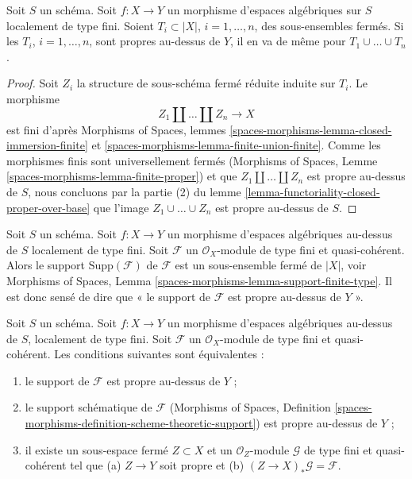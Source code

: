 \begin{lemma}
\label{lemma-union-closed-proper-over-base}
Soit $S$ un schéma.
Soit $f : X \to Y$ un morphisme d'espaces algébriques sur $S$
localement de type fini.
Soient $T_i \subset |X|$, $i = 1, \ldots, n$, des sous-ensembles fermés.
Si les $T_i$, $i = 1, \ldots, n$, sont propres au-dessus de $Y$, il en va de même
pour $T_1 \cup \ldots \cup T_n$.
\end{lemma}

\begin{proof}
Soit $Z_i$ la structure de sous-schéma fermé réduite induite sur $T_i$.
Le morphisme
$$
Z_1 \amalg \ldots \amalg Z_n \longrightarrow X
$$
est fini d'après Morphisms of Spaces, lemmes
\ref{spaces-morphisms-lemma-closed-immersion-finite} et
\ref{spaces-morphisms-lemma-finite-union-finite}.
Comme les morphismes finis sont universellement fermés
(Morphisms of Spaces, Lemme \ref{spaces-morphisms-lemma-finite-proper})
et que $Z_1 \amalg \ldots \amalg Z_n$ est propre au-dessus de $S$,
nous concluons par la partie (2) du lemme
\ref{lemma-functoriality-closed-proper-over-base}
que l'image $Z_1 \cup \ldots \cup Z_n$ est propre au-dessus de $S$.
\end{proof}

\noindent
Soit $S$ un schéma.
Soit $f : X \to Y$ un morphisme d'espaces algébriques au-dessus de $S$
localement de type fini. Soit $\mathcal{F}$ un
$\mathcal{O}_X$-module de type fini et quasi-cohérent. Alors le support
$\text{Supp}(\mathcal{F})$ de $\mathcal{F}$ est un sous-ensemble fermé de $|X|$, voir
Morphisms of Spaces, Lemma \ref{spaces-morphisms-lemma-support-finite-type}.
Il est donc sensé de dire que
« le support de $\mathcal{F}$ est propre au-dessus de $Y$ ».

\begin{lemma}
\label{lemma-module-support-proper-over-base}
Soit $S$ un schéma. Soit $f : X \to Y$ un morphisme d'espaces
algébriques au-dessus de $S$, localement de type fini.
Soit $\mathcal{F}$ un $\mathcal{O}_X$-module de type fini et
quasi-cohérent. Les conditions suivantes sont équivalentes :
\begin{enumerate}
\item le support de $\mathcal{F}$ est propre au-dessus de $Y$ ;
\item le support schématique de $\mathcal{F}$
(Morphisms of Spaces, Definition
\ref{spaces-morphisms-definition-scheme-theoretic-support})
est propre au-dessus de $Y$ ;
\item il existe un sous-espace fermé $Z \subset X$ et un
$\mathcal{O}_Z$-module $\mathcal{G}$ de type fini et quasi-cohérent
tel que (a) $Z \to Y$ soit propre et (b)
$(Z \to X)_*\mathcal{G} = \mathcal{F}$.
\end{enumerate}
\end{lemma}

